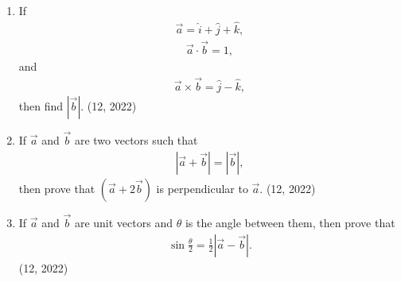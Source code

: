 \begin{enumerate}[label=\thesubsection.\arabic*,ref=\thesubsection.\theenumi]
    \item If
    \begin{align*}
        \overrightarrow{a} = \hat{i} + \hat{j} + \hat{k},
    \end{align*}
    \begin{align*}
        \overrightarrow{a} \cdot \overrightarrow{b} = 1,
    \end{align*}
    and
    \begin{align*}
        \overrightarrow{a} \times \overrightarrow{b} = \hat{j} - \hat{k},
    \end{align*}
    then find $\left| \overrightarrow{b} \right|$.
    \hfill (12, 2022)

    \item If $\overrightarrow{a}$ and $\overrightarrow{b}$ are two vectors such that
    \begin{align*}
        \left| \overrightarrow{a} + \overrightarrow{b} \right| = \left| \overrightarrow{b} \right|,
    \end{align*}
    then prove that $(\overrightarrow{a} + 2\overrightarrow{b})$ is perpendicular to $\overrightarrow{a}$.
    \hfill (12, 2022)

    \item If $\overrightarrow{a}$ and $\overrightarrow{b}$ are unit vectors and $\theta$ is the angle between them, then prove that
    \begin{align*}
        \sin \frac{\theta}{2} = \frac{1}{2} \left| \overrightarrow{a} - \overrightarrow{b} \right|.
    \end{align*}
    \hfill (12, 2022)


\end{enumerate}
